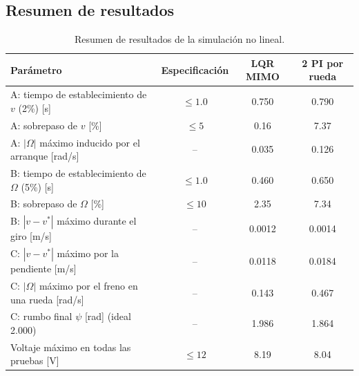 \documentclass[11pt,letterpaper]{article}
\begin{document}
\subsection{Resumen de resultados}
\begin{table}[H]
\centering
\caption{Resumen de resultados de la simulación no lineal.}
\label{tab:resultados}
\begin{tabular}{l c c c}
\toprule
Parámetro & Especificación & LQR MIMO & 2 PI por rueda \\
\midrule
A: tiempo de establecimiento de $v$ (2\%) [s] & $\le 1.0$ & 0.750 & 0.790 \\
A: sobrepaso de $v$ [\%] & $\le 5$ & 0.16 & 7.37 \\
A: $|\Omega|$ máximo inducido por el arranque [rad/s] & -- & 0.035 & 0.126 \\
B: tiempo de establecimiento de $\Omega$ (5\%) [s] & $\le 1.0$ & 0.460 & 0.650 \\
B: sobrepaso de $\Omega$ [\%] & $\le 10$ & 2.35 & 7.34 \\
B: $|v-v^*|$ máximo durante el giro [m/s] & -- & 0.0012 & 0.0014 \\
C: $|v-v^*|$ máximo por la pendiente [m/s] & -- & 0.0118 & 0.0184 \\
C: $|\Omega|$ máximo por el freno en una rueda [rad/s] & -- & 0.143 & 0.467 \\
C: rumbo final $\psi$ [rad] (ideal 2.000) & -- & 1.986 & 1.864 \\
Voltaje máximo en todas las pruebas [V] & $\le 12$ & 8.19 & 8.04 \\
\bottomrule
\end{tabular}
\end{table}

\end{document}
